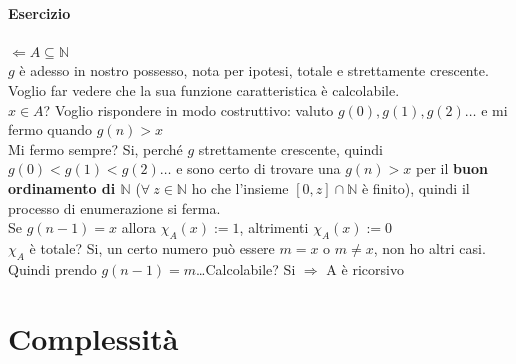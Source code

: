 \documentclass[10pt]{book}
\begin{document}
\paragraph{Esercizio} %
$\Leftarrow A\subseteq \mathbb{N}$\\
$g$ è adesso in nostro possesso, nota per ipotesi, totale e strettamente crescente.
Voglio far vedere che la sua funzione caratteristica è calcolabile.\\
$x\in A$? Voglio rispondere in modo costruttivo: valuto $g(0), g(1), g(2)\ldots$ e mi fermo quando $g(n) > x$\\
Mi fermo sempre? Si, perché $g$ strettamente crescente, quindi $g(0) < g(1) < g(2)\ldots$ e sono certo di trovare una $g(n) > x$ per il \textbf{buon ordinamento di $\mathbb{N}$} ($\forall\:z\in\mathbb{N}$ ho che l'insieme $[0, z] \cap \mathbb{N}$ è finito), quindi il processo di enumerazione si ferma.\\
Se $g(n-1) = x$ allora $\chi_A(x) := 1$, altrimenti $\chi_A(x) := 0$\\
$\chi_A$ è totale? Si, un certo numero può essere $m = x$ o $m \neq x$, non ho altri casi. Quindi prendo $g(n-1) = m$\ldots Calcolabile? Si $\Rightarrow$ A è ricorsivo
\section{Complessità}
\end{document}
